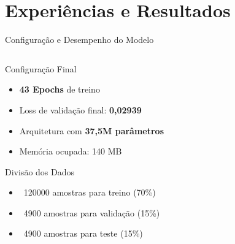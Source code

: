 \documentclass[aspectratio=169,xcolor=dvipsnames]{beamer}
\begin{document}
\section{Experiências e Resultados}
\begin{frame}{Configuração e Desempenho do Modelo}
  \begin{columns}[T]
    \begin{column}{0.48\textwidth}
      \begin{block}{Configuração Final}
        \begin{itemize}
          \item \textbf{43 Epochs} de treino
          \item Loss de validação final: \textbf{0,02939}
          \item Arquitetura com \textbf{37,5M parâmetros}
          \item Memória ocupada: 140 MB
        \end{itemize}
      \end{block}
      
      \vspace{0.3cm}
      
      \begin{exampleblock}{Divisão dos Dados}
        \begin{itemize}
          \item ~120000 amostras para treino (70\%)
          \item ~4900 amostras para validação (15\%)
          \item ~4900 amostras para teste (15\%)
        \end{itemize}
      \end{exampleblock}
    \end{column}
    \begin{column}{0.48\textwidth}
      \begin{table}
        \centering
        \caption{Métricas de Desempenho por Parâmetro}
      \end{table}
    

\end{column}
\end{columns}
\end{frame}
\end{document}
